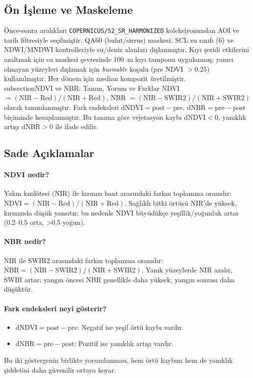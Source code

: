 \documentclass[11pt,a4paper]{article}
\begin{document}
\subsection{Ön İşleme ve Maskeleme}
Önce-sonra aralıkları \texttt{COPERNICUS/S2\_SR\_HARMONIZED} koleksiyonundan AOI ve tarih filtresiyle seçilmiştir. QA60 (bulut/sirrus) maskesi, SCL su sınıfı (6) ve NDWI/MNDWI kontrolleriyle su/deniz alanları dışlanmıştır. Kıyı şeridi etkilerini azaltmak için su maskesi çevresinde \SI{100}{m} kıyı tamponu uygulanmış; yanıcı olmayan yüzeyleri dışlamak için \emph{burnable} koşulu (pre NDVI $>0.25$) kullanılmıştır. Her dönem için median kompozit üretilmiştir.
\\subsection{NDVI ve NBR: Tanım, Yorum ve Farklar}
NDVI $=(\mathrm{NIR}-\mathrm{Red})/(\mathrm{NIR}+\mathrm{Red})$, NBR $=(\mathrm{NIR}-\mathrm{SWIR2})/(\mathrm{NIR}+\mathrm{SWIR2})$ olarak tanımlanmıştır. Fark endeksleri \(\mathrm{dNDVI}=\mathrm{post}-\mathrm{pre}\), \(\mathrm{dNBR}=\mathrm{pre}-\mathrm{post}\) biçiminde hesaplanmıştır. Bu tanıma göre vejetasyon kaybı dNDVI$<0$, yanıklık artışı dNBR$>0$ ile ifade edilir.

\subsection{Sade Açıklamalar}
\paragraph{NDVI nedir?}
Yakın kızılötesi (NIR) ile kırmızı bant arasındaki farkın toplamına oranıdır:\,\(\mathrm{NDVI}=(\mathrm{NIR}-\mathrm{Red})/(\mathrm{NIR}+\mathrm{Red})\). Sağlıklı bitki örtüsü NIR'de yüksek, kırmızıda düşük yansıtır; bu nedenle NDVI büyüdükçe yeşillik/yoğunluk artar (0.2--0.5 orta, >0.5 yoğun).

\paragraph{NBR nedir?}
NIR ile SWIR2 arasındaki farkın toplamına oranıdır:\,\(\mathrm{NBR}=(\mathrm{NIR}-\mathrm{SWIR2})/(\mathrm{NIR}+\mathrm{SWIR2})\). Yanık yüzeylerde NIR azalır, SWIR artar; yangın öncesi NBR genellikle daha yüksek, yangın sonrası daha düşüktür.

\paragraph{Fark endeksleri neyi gösterir?}
\begin{itemize}
  \item \(\mathrm{dNDVI}=\mathrm{post}-\mathrm{pre}\): Negatif ise yeşil örtü kaybı vardır.
  \item \(\mathrm{dNBR}=\mathrm{pre}-\mathrm{post}\): Pozitif ise yanıklık artışı vardır.
\end{itemize}
Bu iki göstergenin birlikte yorumlanması, hem örtü kaybını hem de yanıklık şiddetini daha güvenilir ortaya koyar.
\end{document}
